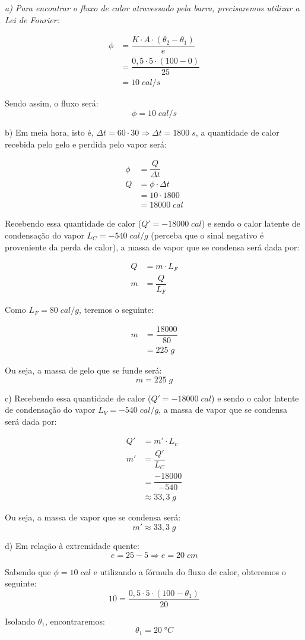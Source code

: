 \documentclass[12pt,twoside]{article}
\newenvironment{resposta*}
{\bf Resposta:\\ }
{}
\begin{document}
\begin{resposta*}
{\it a) Para encontrar o fluxo de calor atravessado pela barra, precisaremos utilizar a Lei de Fourier:

\begin{align*}
\phi &= \dfrac{K\cdot A \cdot (\theta_{2}-\theta_{1})}{e} \\
&= \dfrac{0,5\cdot 5 \cdot (100-0)}{25}\\
&= 10\;cal/s
\end{align*}

Sendo assim, o fluxo será: \[\boxed{\phi=10\;cal/s}\]

b) Em meia hora, isto é, $\Delta t=60\cdot 30 \Rightarrow \Delta t = 1800\;s$, a quantidade de calor recebida pelo gelo e perdida pelo vapor será:

\begin{align*}
\phi &= \dfrac{Q}{\Delta t} \\
Q &= \phi\cdot \Delta t \\
&= 10 \cdot 1800 \\
&= 18000\;cal
\end{align*}

Recebendo essa quantidade de calor ($Q'=-18000\;cal$) e sendo o calor latente de condensação do vapor $L_{C}=-540\;cal/g$ (perceba que o sinal negativo é proveniente da perda de calor), a massa de vapor que se condensa será dada por: 

\begin{align*}
Q &= m \cdot L_{F} \\
m &= \dfrac{Q}{L_{F}}
\end{align*}

Como $L_{F}=80\;cal/g$, teremos o seguinte:

\begin{align*}
m &= \dfrac{18000}{80} \\
&= 225\;g
\end{align*}

Ou seja, a massa de gelo que se funde será: \[\boxed{m=225\;g}\]

c) Recebendo essa quantidade de calor ($Q'=-18000\;cal$) e sendo o calor latente de condensação do vapor $L_{V}=-540\;cal/g$, a massa de vapor que se condensa será dada por:

\begin{align*}
Q' &= m'\cdot L_{v}  \\
m' &= \dfrac{Q'}{L_{C}} \\
&= \dfrac{-18000}{-540} \\
&\approx 33,3\;g
\end{align*}

Ou seja, a massa de vapor que se condensa será: \[\boxed{m'\approx 33,3\;g}\]

d) Em relação à extremidade quente: \[e=25-5\Rightarrow e=20\;cm\]

Sabendo que $\phi=10\;cal$ e utilizando a fórmula do fluxo de calor, obteremos o seguinte: \[10=\dfrac{0,5\cdot 5\cdot (100-\theta_{1})}{20}\]

Isolando $\theta_{1}$, encontraremos: \[\boxed{\theta_{1}=20\;°C}\]}
\end{resposta*}
\end{document}
